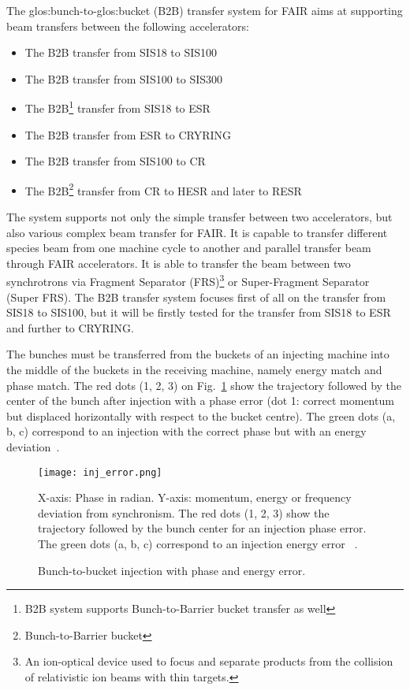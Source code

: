 The \gls{glos:bunch}-to-\gls{glos:bucket} (\gls{B2B}) transfer system for FAIR aims at supporting beam transfers between the following accelerators:
\begin{itemize}
\item The B2B transfer from \gls{SIS18} to \gls{SIS100}
\item The B2B transfer from \gls{SIS100} to \gls{SIS300}
\item The B2B\footnote{B2B system supports Bunch-to-Barrier bucket transfer as well} transfer from SIS18 to \gls{ESR}
\item The B2B transfer from ESR to CRYRING
\item The B2B transfer from SIS100 to \gls{CR}
\item The B2B\footnote{Bunch-to-Barrier bucket} transfer from CR to \gls{HESR} and later to \gls{RESR}
\end{itemize}

The system supports not only the simple transfer between two accelerators, but also various complex beam transfer for FAIR. It is capable to transfer different species beam from one machine cycle to another and parallel transfer beam through FAIR accelerators. It is able to transfer the beam between two synchrotrons via Fragment Separator (\gls{FRS})\footnote{An ion-optical device used to focus and separate products from the collision of relativistic ion beams with thin targets.} or Super-Fragment Separator (Super FRS). The B2B transfer system focuses first of all on the transfer from SIS18 to SIS100, but it will be firstly tested for the transfer from SIS18 to ESR and further to CRYRING.  

The bunches must be transferred from the buckets of an injecting machine into the middle of the buckets in the receiving machine, namely energy match and phase match. The red dots (1, 2, 3) on Fig.~\ref{inj_error} show the trajectory followed by the center of the bunch after injection with a phase error (dot 1: correct momentum but displaced horizontally with respect to the bucket centre). The green dots (a, b, c) correspond to an injection with the correct phase but with an energy deviation~\cite{baudrenghien_low-level_2010}. 
\begin{figure}[!htb]
   \centering   
   \texttt{[image: inj\_error.png]}
   \caption{Bunch-to-bucket injection with phase and energy error.}{X-axis: Phase in radian. Y-axis: momentum, energy or frequency deviation
from synchronism. The red dots (1, 2, 3) show the trajectory followed by the bunch center for an injection phase error. The green dots (a, b, c) correspond to an injection energy error ~\cite{baudrenghien_low-level_2010}.}
   \label{inj_error}
\end{figure}

